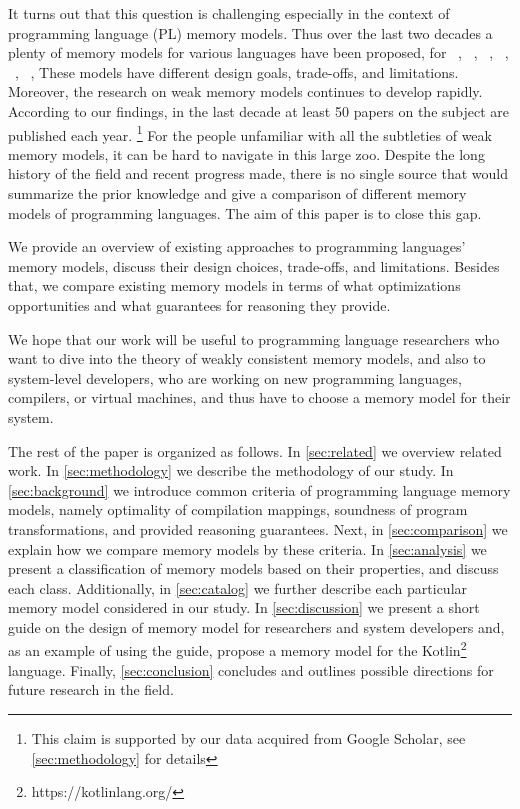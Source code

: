 It turns out that this question is challenging
especially in the context of programming language (PL) memory models.
Thus over the last two decades a plenty of memory models 
for various languages have been proposed, \eg
for \Java~\cite{Manson-al:POPL05, Bender-Palsberg:OOPSLA19}, \CPP~\cite{Batty-al:POPL11}, 
\LLVM~\cite{Chakraborty-Vafeiadis:CGO17}, \JS~\cite{Watt-al:PLDI2020}, 
\OCaml~\cite{Manson-al:POPL05}, \Haskell~\cite{Vollmer-al:PPoPP17}, \etc 
These models have different design goals, trade-offs, and limitations.
Moreover, the research on weak memory models continues to develop rapidly.
According to our findings, 
in the last decade at least 50 papers on the subject are published each year.%
\footnote{This claim is supported by our data acquired from Google Scholar, 
see \cref{sec:methodology} for details}  
For the people unfamiliar with all the subtleties 
of weak memory models, it can be hard to navigate in this large zoo.
Despite the long history of the field and recent progress made, 
there is no single source that would summarize the prior knowledge
and give a comparison of different memory models of programming languages. 
The aim of this paper is to close this gap.

We provide an overview of existing approaches to 
programming languages' memory models,
discuss their design choices, trade-offs, and limitations.
Besides that, we compare existing memory models 
in terms of what optimizations opportunities 
and what guarantees for reasoning they provide.

We hope that our work will be useful to programming language researchers 
who want to dive into the theory of weakly consistent memory models,
and also to system-level developers, 
who are working on new programming languages, compilers, or virtual machines, 
and thus have to choose a memory model for their system.

The rest of the paper is organized as follows.
In \cref{sec:related} we overview related work. 
In \cref{sec:methodology} we describe the methodology 
of our study. In \cref{sec:background} we 
introduce common criteria of programming language memory models,
namely optimality of compilation mappings, 
soundness of program transformations, 
and provided reasoning guarantees.
Next, in \cref{sec:comparison} we explain 
how we compare memory models by these criteria.
In \cref{sec:analysis} we present a classification
of memory models based on their properties, 
and discuss each class. 
Additionally, in \cref{sec:catalog} we further describe 
each particular memory model considered in our study.
In \cref{sec:discussion} we present a short guide 
on the design of memory model for researchers and system developers
and, as an example of using the guide, propose a memory model for 
the Kotlin\footnote{https://kotlinlang.org/} language.
Finally, \cref{sec:conclusion} concludes 
and outlines possible directions for future research in the field. 
